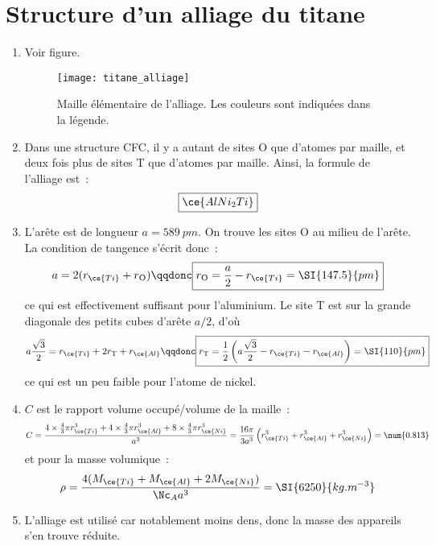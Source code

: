 \documentclass[a4paper, 12pt, final, garamond]{book}
\begin{document}
\section{Structure d'un alliage du titane}
\begin{enumerate}
  \item Voir figure.
    \begin{figure}[h]
      \centering
      \texttt{[image: titane\_alliage]}
      \caption{Maille élémentaire de l'alliage. Les couleurs sont indiquées dans
      la légende.}
      \label{fig:titall}
    \end{figure}
  \item Dans une structure CFC, il y a autant de sites O que d'atomes par
    maille, et deux fois plus de sites T que d'atomes par maille. Ainsi, la
    formule de l'alliage est~:
    \[
      \boxed{\ce{AlNi_2Ti}}
    \]
  \item L'arête est de longueur $a = \SI{589}{pm}$. On trouve les sites O au
    milieu de l'arête. La condition de tangence s'écrit donc~:
    \[
      a = 2 (r_{\ce{Ti}} + r_{\mathrm{O}})
      \qqdonc
      \boxed{r_{\mathrm{O}} = \frac{a}{2} - r_{\ce{Ti}} = \SI{147.5}{pm}}
    \]
    ce qui est effectivement suffisant pour l'aluminium. Le site T est sur la
    grande diagonale des petits cubes d'arête $a/2$, d'où
    \[
      a \frac{\sqrt{3}}{2} = r_{\ce{Ti}} + 2r_{\mathrm{T}} + r_{\ce{Al}}
      \qqdonc
      \boxed{r_{\mathrm{T}} = \frac{1}{2} \left( a \frac{\sqrt{3}}{2} -
      r_{\ce{Ti}} - r_{\ce{Al}} \right) = \SI{110}{pm}}
    \]
    ce qui est un peu faible pour l'atome de nickel.
  \item $C$ est le rapport volume occupé/volume de la maille~:
    \[
      C = \frac{4\times \frac{4}{3}\pi r_{\ce{Ti}}^{3} + 4\times \frac{4}{3}\pi
      r_{\ce{Al}}^{3} + 8\times \frac{4}{3}\pi r_{\ce{Ni}}^{3}}{a^3}
      = \frac{16\pi}{3a^3} \left( r_{\ce{Ti}}^{3} + r_{\ce{Al}}^{3} +
      r_{\ce{Ni}}^{3} \right) = \num{0.813}
    \]
    et pour la masse volumique~:
    \[
      \rho = \frac{4 (M_{\ce{Ti}} + M_{\ce{Al}} + 2M_{\ce{Ni}})}{\Nc_Aa^3}
           = \SI{6250}{kg.m ^{-3}}
    \]
  \item L'alliage est utilisé car notablement moins dens, donc la masse des
    appareils s'en trouve réduite.
\end{enumerate}
\end{document}
